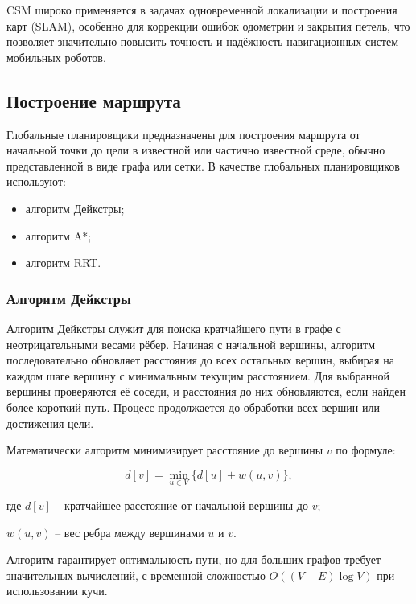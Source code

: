 {CSM широко применяется в задачах одновременной локализации и построения карт (SLAM), особенно для коррекции ошибок одометрии и закрытия петель, что позволяет значительно повысить точность и надёжность навигационных систем мобильных роботов.


\subsection{Построение маршрута}
Глобальные планировщики предназначены для построения маршрута от начальной точки
до цели в известной или частично известной среде, обычно представленной в виде
графа или сетки. В качестве глобальных планировщиков используют:
\begin{itemize}
	\item алгоритм Дейкстры;
	\item алгоритм A*;
	\item алгоритм RRT.
\end{itemize}

\subsubsection{Алгоритм Дейкстры}

Алгоритм Дейкстры служит для поиска кратчайшего пути в графе с неотрицательными
весами рёбер. Начиная с начальной вершины, алгоритм последовательно обновляет
расстояния до всех остальных вершин, выбирая на каждом шаге вершину с
минимальным текущим расстоянием. Для выбранной вершины проверяются её соседи, и
расстояния до них обновляются, если найден более короткий путь. Процесс
продолжается до обработки всех вершин или достижения цели.

Математически алгоритм минимизирует расстояние до вершины $v$ по формуле:

\begin{equation}
d[v] = \min_{u \in V} \{ d[u] + w(u, v) \},
\end{equation}

\begin{explanationx}
\item[где] $d[v]$ -- кратчайшее расстояние от начальной вершины до $v$;
\item $w(u, v)$ -- вес ребра между вершинами $u$ и $v$.
\end{explanationx}

Алгоритм гарантирует оптимальность пути,
но для больших графов требует значительных вычислений,
с временной сложностью $O((V + E) \log V)$ при использовании кучи.

}
